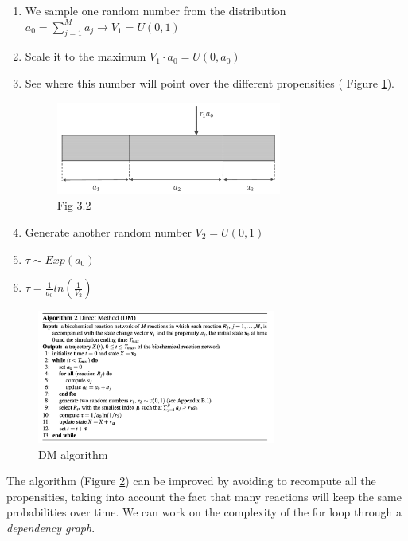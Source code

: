 \begin{enumerate}
  \def\labelenumi{\arabic{enumi}.}
  \item We sample one random number from the distribution $a_0 = \sum_{j=1}^{M}{a_j}\rightarrow V_1=U(0,1)$
  \item Scale it to the maximum $V_1 \cdot a_0 =U(0,a_0)$
  \item See where this number will point over the different propensities ( Figure \ref{fig:boundaries}).

  \begin{figure}
    \centering
    \includegraphics[width=0.7\textwidth]{boundaries.png}
    \caption{Fig 3.2}
    \label{fig:boundaries}
  \end{figure}

  \item Generate another random number $V_2 =U(0,1)$ \item $\tau \sim Exp(a_0)$ \item $\tau = \frac{1}{a_0}ln(\frac{1}{V_2})$
\end{enumerate}


 \begin{figure}
    \centering
    \includegraphics[width=0.7\textwidth]{direct_method.png}
    \caption{DM algorithm}
    \label{fig:DM_algo}
  \end{figure}

 \noindent
The algorithm (Figure \ref{fig:DM_algo}) can be improved by avoiding to recompute all the propensities, taking into account the fact that many reactions will keep the same probabilities over time.
We can work on the complexity of the for loop through a \emph{dependency graph}.

